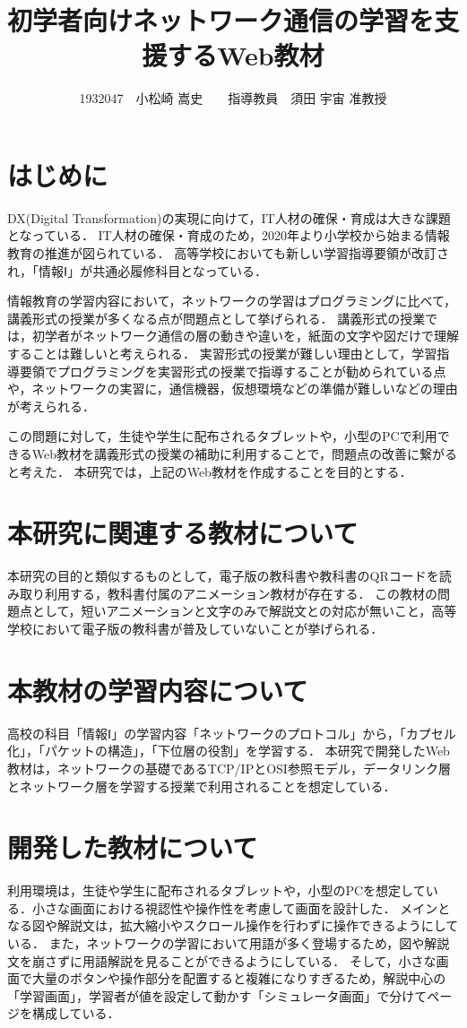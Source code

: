 \documentclass[twocolumn,10pt,a4j]{ltjsarticle}
\title{初学者向けネットワーク通信の学習を支援するWeb教材}
\author{1932047　小松崎 嵩史　　指導教員　須田 宇宙 准教授}
\date{}
\begin{document}
\maketitle

\section{はじめに}

DX(Digital Transformation)の実現に向けて，IT人材の確保・育成は大きな課題となっている\cite{dx}．
IT人材の確保・育成のため，2020年より小学校から始まる情報教育の推進が図られている．
高等学校においても新しい学習指導要領が改訂され，「情報Ⅰ」が共通必履修科目となっている．


情報教育の学習内容において，ネットワークの学習はプログラミングに比べて，講義形式の授業が多くなる点が問題点として挙げられる．
講義形式の授業では，初学者がネットワーク通信の層の動きや違いを，紙面の文字や図だけで理解することは難しいと考えられる．
実習形式の授業が難しい理由として，学習指導要領でプログラミングを実習形式の授業で指導することが勧められている点や，ネットワークの実習に，通信機器，仮想環境などの準備が難しいなどの理由が考えられる．

この問題に対して，生徒や学生に配布されるタブレットや，小型のPCで利用できるWeb教材を講義形式の授業の補助に利用することで，問題点の改善に繋がると考えた．
本研究では，上記のWeb教材を作成することを目的とする．

\section{本研究に関連する教材について}
本研究の目的と類似するものとして，電子版の教科書や教科書のQRコードを読み取り利用する，教科書付属のアニメーション教材が存在する．
この教材の問題点として，短いアニメーションと文字のみで解説文との対応が無いこと，高等学校において電子版の教科書が普及していないことが挙げられる．

\section{本教材の学習内容について}
高校の科目「情報Ⅰ」の学習内容「ネットワークのプロトコル」から，「カプセル化」，「パケットの構造」，「下位層の役割」を学習する．
本研究で開発したWeb教材は，ネットワークの基礎であるTCP/IPとOSI参照モデル，データリンク層とネットワーク層を学習する授業で利用されることを想定している．

\section{開発した教材について}
利用環境は，生徒や学生に配布されるタブレットや，小型のPCを想定している．小さな画面における視認性や操作性を考慮して画面を設計した．
メインとなる図や解説文は，拡大縮小やスクロール操作を行わずに操作できるようにしている．
また，ネットワークの学習において用語が多く登場するため，図や解説文を崩さずに用語解説を見ることができるようにしている．
そして，小さな画面で大量のボタンや操作部分を配置すると複雑になりすぎるため，解説中心の「学習画面」，学習者が値を設定して動かす「シミュレータ画面」で分けてページを構成している．
\end{document}
